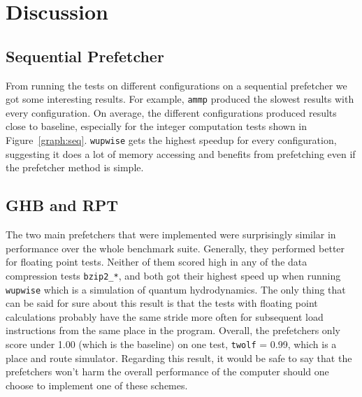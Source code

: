 \section{Discussion} %


\subsection{Sequential Prefetcher}

From running the tests on different configurations on a sequential
prefetcher we got some interesting results. For example, \texttt{ammp}
produced the slowest results with every configuration. On average, the
different configurations produced results close to baseline,
especially for the integer computation tests shown in
Figure~\ref{graph:seq}. \texttt{wupwise} gets the highest speedup for
every configuration, suggesting it does a lot of memory accessing and
benefits from prefetching even if the prefetcher method is simple.

\subsection{GHB and RPT}
The two main prefetchers that were implemented were surprisingly
similar in performance over the whole benchmark suite. Generally, they
performed better for floating point tests. Neither of them scored high
in any of the data compression tests \texttt{bzip2\_*}, and both got
their highest speed up when running \texttt{wupwise} which is a simulation of
quantum hydrodynamics. The only thing that can be said for sure about
this result is that the tests with floating point calculations probably
have the same stride more often for subsequent load instructions from
the same place in the program. Overall, the prefetchers only score
under 1.00 (which is the baseline) on one test, \texttt{twolf} = 0.99,
which is a place and route simulator. Regarding this result, it would
be safe to say that the prefetchers won't harm the overall performance
of the computer should one choose to implement one of these schemes.
